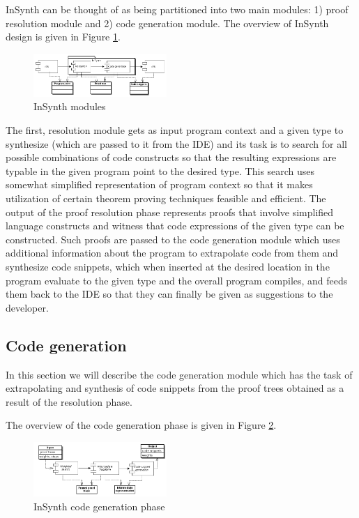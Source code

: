 \documentclass[preprint, nocopyrightspace]{sigplanconf}
\begin{document}
InSynth can be thought of as being partitioned into two main modules: 1) proof resolution module and 2) code generation module.
The overview of InSynth design is given in Figure \ref{fig:InSynth_modules}. 

\begin{figure}[ht]
\centering
\includegraphics[width=0.45\textwidth]{sav_prez/in_synth_to_export}
\caption{InSynth modules}
\label{fig:InSynth_modules}
\end{figure}

The first, resolution module gets as input program context and a given type to synthesize (which are passed to it from the IDE) and its task is to search for all possible combinations of code constructs so that the resulting expressions are typable in the given program point to the desired type.
This search uses somewhat simplified representation of program context so that it makes utilization of certain theorem proving techniques feasible and efficient.
The output of the proof resolution phase represents proofs that involve simplified language constructs and witness that code expressions of the given type can be constructed.
Such proofs are passed to the code generation module which uses additional information about the program to extrapolate code from them and synthesize code snippets, which when inserted at the desired location in the program evaluate to the given type and the overall program compiles, and feeds them back to the IDE so that they can finally be given as suggestions to the developer.   


\subsection{Code generation}

In this section we will describe the code generation module which has the task of extrapolating and synthesis of code snippets from the proof trees obtained as a result of the resolution phase.

The overview of the code generation phase is given in Figure \ref{fig:InSynth_code_generation}. 

\begin{figure}[ht]
\centering
\includegraphics[width=0.45\textwidth]{sav_prez/code_generation_steps}
\caption{InSynth code generation phase}
\label{fig:InSynth_code_generation}
\end{figure}
\end{document}

